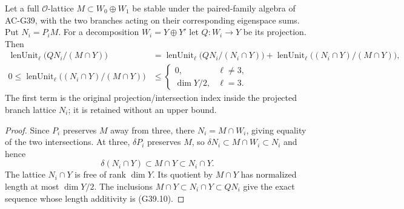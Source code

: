 \begin{corollary}
\label{AC-G39-lattice}
Let a full $\mathcal O$-lattice $M\subset W_0\oplus W_1$
be stable under the paired-family algebra of AC-G39, with
the two branches acting on their corresponding eigenspace
sums.  Put $N_i=P_iM$.  For a decomposition
$W_i=Y\oplus Y'$ let $Q:W_i\to Y$ be its projection.
Then
\[
\begin{split}
 \operatorname{lenUnit}_\ell\bigl(QN_i/(M\cap Y)\bigr)
 &=\operatorname{lenUnit}_\ell\bigl(QN_i/(N_i\cap Y)\bigr)
   +\operatorname{lenUnit}_\ell\bigl((N_i\cap Y)/(M\cap Y)\bigr),\\
 0\le\operatorname{lenUnit}_\ell\bigl((N_i\cap Y)/(M\cap Y)\bigr)
 &\le
 \begin{cases}0,&\ell\ne3,\\ \dim Y/2,&\ell=3.
 \end{cases}
\end{split}                                                   \tag{G39.10}
\]
The first term is the original projection/intersection
index inside the projected branch lattice $N_i$; it is
retained without an upper bound.
\end{corollary}
\begin{proof}
Since $P_i$ preserves $M$ away from three, there
$N_i=M\cap W_i$, giving equality of the two intersections.
At three, $\delta P_i$ preserves $M$, so
$\delta N_i\subset M\cap W_i\subset N_i$ and hence
\[
             \delta(N_i\cap Y)\subset M\cap Y\subset N_i\cap Y.
\]
The lattice $N_i\cap Y$ is free of rank $\dim Y$.
Its quotient by $M\cap Y$ has normalized length at most
$\dim Y/2$.  The inclusions
$M\cap Y\subset N_i\cap Y\subset QN_i$ give the exact
sequence whose length additivity is (G39.10).
\end{proof}

